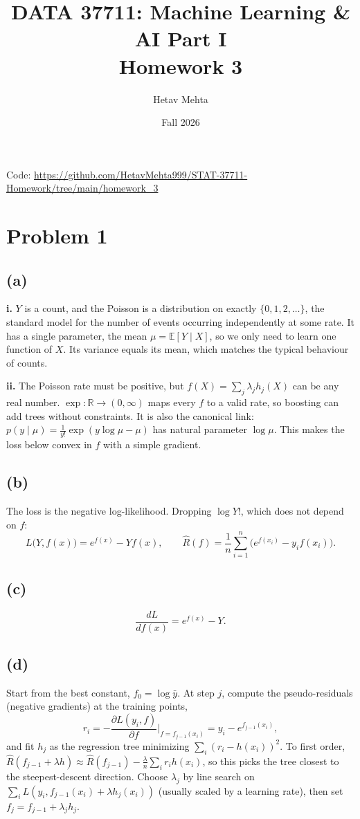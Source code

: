 \documentclass[11pt]{article}
\title{DATA 37711: Machine Learning \& AI Part I\\Homework 3}
\author{Hetav Mehta}
\date{Fall 2026}
\newcommand{\E}{\mathbb{E}}
\newcommand{\R}{\mathbb{R}}
\begin{document}
\maketitle

\begin{center}
Code: \url{https://github.com/HetavMehta999/STAT-37711-Homework/tree/main/homework_3}
\end{center}

\section*{Problem 1}

\subsection*{(a)}
\textbf{i.} $Y$ is a count, and the Poisson is a distribution on exactly $\{0,1,2,\dots\}$, the standard
model for the number of events occurring independently at some rate. It has a single parameter, the
mean $\mu=\E[Y\mid X]$, so we only need to learn one function of $X$. Its variance equals its mean,
which matches the typical behaviour of counts.

\textbf{ii.} The Poisson rate must be positive, but $f(X)=\sum_j\lambda_j h_j(X)$ can be any real number.
$\exp:\R\to(0,\infty)$ maps every $f$ to a valid rate, so boosting can add trees without constraints.
It is also the canonical link: $p(y\mid\mu)=\frac{1}{y!}\exp(y\log\mu-\mu)$ has natural parameter
$\log\mu$. This makes the loss below convex in $f$ with a simple gradient.

\subsection*{(b)}
The loss is the negative log-likelihood. Dropping $\log Y!$, which does not depend on $f$:
\[
  L\big(Y,f(x)\big) = e^{f(x)} - Y f(x), \qquad \hat R(f)=\frac1n\sum_{i=1}^n\Big(e^{f(x_i)}-y_if(x_i)\Big).
\]

\subsection*{(c)}
\[
  \frac{dL}{df(x)} = e^{f(x)} - Y .
\]

\subsection*{(d)}
Start from the best constant, $f_0=\log\bar y$. At step $j$, compute the pseudo-residuals (negative
gradients) at the training points,
\[
  r_i = -\frac{\partial L(y_i,f)}{\partial f}\Big|_{f=f_{j-1}(x_i)} = y_i - e^{f_{j-1}(x_i)},
\]
and fit $h_j$ as the regression tree minimizing $\sum_i (r_i - h(x_i))^2$. To first order,
$\hat R(f_{j-1}+\lambda h)\approx \hat R(f_{j-1})-\frac{\lambda}{n}\sum_i r_ih(x_i)$, so this picks the tree
closest to the steepest-descent direction. Choose $\lambda_j$ by line search on
$\sum_i L(y_i, f_{j-1}(x_i)+\lambda h_j(x_i))$ (usually scaled by a learning rate), then set
$f_j=f_{j-1}+\lambda_jh_j$.
\end{document}
